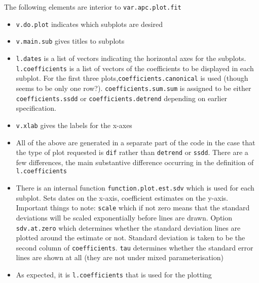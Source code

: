 \documentclass{article}
\begin{document}
The following elements are interior to \texttt{var.apc.plot.fit}
\begin{itemize}
\item \texttt{v.do.plot} indicates which subplots are desired
\item \texttt{v.main.sub} gives titles to subplots
\item \texttt{l.dates} is a list of vectors indicating the horizontal axes for the subplots. \texttt{l.coefficients} is a list of vectors of the coefficients to be displayed in each subplot. For the first three plots,\texttt{coefficients.canonical} is used (though seems to be only one row?). \texttt{coefficients.sum.sum} is assigned to be either \texttt{coefficients.ssdd} or \texttt{coefficients.detrend} depending on earlier specification.
\item \texttt{v.xlab} gives the labels for the x-axes
\item All of the above are generated in a separate part of the code in the case that the type of plot requested is \texttt{dif} rather than \texttt{detrend} or \texttt{ssdd}. There are a few differences, the main substantive difference occurring in the definition of \texttt{l.coefficients}
\item There is an internal function \texttt{function.plot.est.sdv} which is used for each subplot. Sets dates on the x-axis, coefficient estimates on the y-axis. Important things to note: \texttt{scale} which if not zero means that the standard deviations will be scaled exponentially before lines are drawn. Option \texttt{sdv.at.zero} which determines whether the standard deviation lines are plotted around the estimate or not. Standard deviation is taken to be the second column of \texttt{coefficients}. \texttt{tau} determines whether the standard error lines are shown at all (they are not under mixed parameterisation)
\item As expected, it is \texttt{l.coefficients} that is used for the plotting

\end{itemize}
\end{document}
